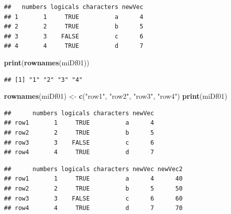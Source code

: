\documentclass[]{book}
\newenvironment{Shaded}{\begin{snugshade}}{\end{snugshade}}
\newcommand{\DecValTok}[1]{\textcolor[rgb]{0.00,0.00,0.81}{#1}}
\newcommand{\KeywordTok}[1]{\textcolor[rgb]{0.13,0.29,0.53}{\textbf{#1}}}
\newcommand{\NormalTok}[1]{#1}
\newcommand{\OperatorTok}[1]{\textcolor[rgb]{0.81,0.36,0.00}{\textbf{#1}}}
\newcommand{\StringTok}[1]{\textcolor[rgb]{0.31,0.60,0.02}{#1}}
\begin{document}
\begin{verbatim}
##   numbers logicals characters newVec
## 1       1     TRUE          a      4
## 2       2     TRUE          b      5
## 3       3    FALSE          c      6
## 4       4     TRUE          d      7
\end{verbatim}

\begin{Shaded}
\begin{Highlighting}[]
\KeywordTok{print}\NormalTok{(}\KeywordTok{rownames}\NormalTok{(miDf01))}
\end{Highlighting}
\end{Shaded}

\begin{verbatim}
## [1] "1" "2" "3" "4"
\end{verbatim}

\begin{Shaded}
\begin{Highlighting}[]
\KeywordTok{rownames}\NormalTok{(miDf01) <-}\StringTok{ }\KeywordTok{c}\NormalTok{(}\StringTok{"row1"}\NormalTok{, }\StringTok{"row2"}\NormalTok{, }\StringTok{"row3"}\NormalTok{, }\StringTok{"row4"}\NormalTok{)}
\KeywordTok{print}\NormalTok{(miDf01)}
\end{Highlighting}
\end{Shaded}

\begin{verbatim}
##      numbers logicals characters newVec
## row1       1     TRUE          a      4
## row2       2     TRUE          b      5
## row3       3    FALSE          c      6
## row4       4     TRUE          d      7
\end{verbatim}

\begin{Shaded}
\end{Shaded}

\begin{verbatim}
##      numbers logicals characters newVec newVec2
## row1       1     TRUE          a      4      40
## row2       2     TRUE          b      5      50
## row3       3    FALSE          c      6      60
## row4       4     TRUE          d      7      70
\end{verbatim}
\end{document}
